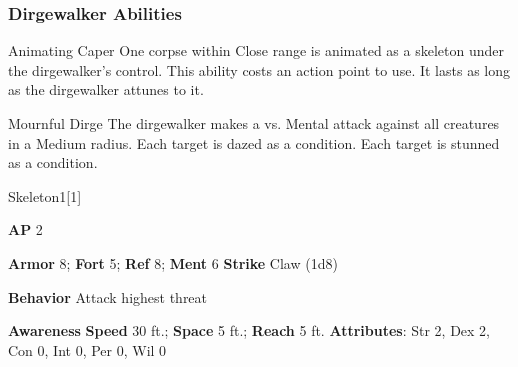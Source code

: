 \subsubsection{Dirgewalker Abilities}

\begin{ability}{Animating Caper}
One corpse within Close range is animated as a skeleton under the dirgewalker's control.
This ability costs an action point to use.
It lasts as long as the dirgewalker attunes to it.
\end{ability}

\vspace{0.5em}
\begin{ability}{Mournful Dirge}
The dirgewalker makes a  vs. Mental attack against all creatures in a Medium radius.
\hit Each target is dazed as a condition.
\crit Each target is stunned as a condition.
\end{ability}






\begin{monsection}{Skeleton}{1}[1]
\vspace{-1em}\vspace{-1em}
\begin{spellcontent}
\begin{spelltargetinginfo}
{\textbf{AP} 2}

\pari \textbf{Armor} 8;
\textbf{Fort} 5;
\textbf{Ref} 8;
\textbf{Ment} 6
\pari \textbf{Strike} Claw  (1d8)



\pari \textbf{Behavior} Attack highest threat
\end{spelltargetinginfo}
\end{spellcontent}

\begin{monsterfooter}
\pari \textbf{Awareness} 
\pari \textbf{Speed} 30 ft.;
\textbf{Space} 5 ft.;
\textbf{Reach} 5 ft.
\pari \textbf{Attributes}:
Str 2,
Dex 2,
Con 0,
Int 0,
Per 0,
Wil 0
\end{monsterfooter}
\end{monsection}





